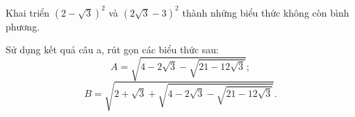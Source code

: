 \begin{practice}
\begin{questions}[resume=SBT]
        \item
        \begin{questions}
            \item Khai triển $\left(2-\sqrt{3}\right)^2$ và $\left(2\sqrt{3}-3\right)^2$ thành những biểu thức không còn bình phương.
            \item Sử dụng kết quả câu a, rút gọn các biểu thức sau:
            \[
                A=\sqrt{4-2\sqrt{3}-\sqrt{21-12\sqrt{3}}};
            \]
            \[
                B=\sqrt{2+\sqrt{3}+\sqrt{4-2\sqrt{3}-\sqrt{21-12\sqrt{3}}}}.
            \]
        \end{questions}
        \answerline
        \answerline
    \end{questions}
\end{practice}
